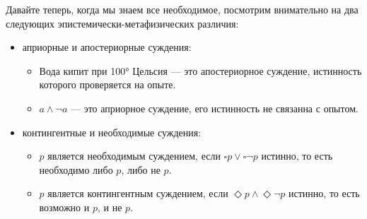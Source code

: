 \documentclass[openany]{book}
\theoremstyle{plain}
\theoremstyle{definition}
\begin{document}
Давайте теперь, когда мы знаем все необходимое, посмотрим внимательно на два следующих эпистемически-метафизических различия:
\begin{itemize}
    \item априорные и апостериорные суждения:
	\begin{itemize}
	    \item Вода кипит при 100° Цельсия --- это апостериорное суждение, истинность которого проверяется на опыте.
	    \item \(a \land \neg a\) --- это априорное суждение, его истинность не связанна с опытом.
	\end{itemize}
    \item контингентные и необходимые суждения:
	\begin{itemize}
	    \item \(p\) является необходимым суждением, если \(\square p \lor \square \neg p\) истинно, то есть необходимо либо \(p\), либо не \(p\).
	    \item \(p\) является контингентным суждением, если \(\Diamond p \land \Diamond \neg p\) истинно, то есть возможно и \(p\), и не \(p\).
	\end{itemize}
\end{itemize}    
\end{document}
